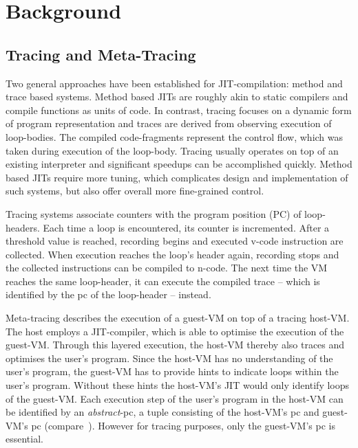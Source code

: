 \section{Background}

\subsection{Tracing and Meta-Tracing}

Two general approaches have been established for JIT-compilation: method and
trace based systems. Method based JITs are roughly akin to static compilers and compile
functions as units of code. In contrast, tracing focuses on a dynamic form of
program representation and traces are derived from observing execution of
loop-bodies. The compiled code-fragments represent the control flow, which was
taken during execution of the loop-body. Tracing usually operates on top of an
existing interpreter and significant speedups can be accomplished quickly.
Method based JITs require more tuning, which complicates design and
implementation of such systems, but also offer overall more fine-grained
control.

Tracing systems associate counters with the program position (PC) of
loop-headers. Each time a loop is encountered, its counter is incremented. After
a threshold value is reached, recording begins and executed v-code instruction
are collected. When execution reaches the loop's header again, recording stops
and the collected instructions can be compiled to n-code. The next time
the VM reaches the same loop-header, it can execute the compiled trace -- which
is identified by the pc of the loop-header -- instead.

Meta-tracing describes the execution of a guest-VM on top of a tracing
host-VM. The host employs a JIT-compiler, which is able to optimise the
execution of the guest-VM. Through this layered execution, the host-VM thereby also
traces and optimises the user's program. Since the host-VM has no understanding
of the user's program, the guest-VM has to provide hints to indicate loops
within the user's program. Without these hints the host-VM's JIT would only
identify loops of the guest-VM. Each execution step of the user's program in the
host-VM can be identified by an \emph{abstract}-pc, a tuple consisting of the
host-VM's pc and guest-VM's pc (compare~\cite{sullivan2003dynamic}). However for
tracing purposes, only the guest-VM's pc is essential.




